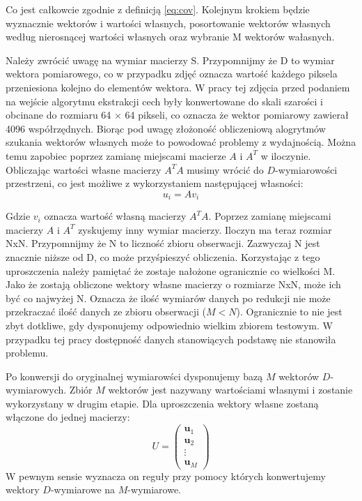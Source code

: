 \documentclass{article}
\newcommand{\bb}{\textbf}
\begin{document}
Co jest całkowcie zgodnie z definicją \ref{eq:cov}. Kolejnym krokiem będzie wyznacznie wektorów i wartości własnych, posortowanie wektorów własnych według nierosnącej wartości własnych oraz wybranie M wektorów wałasnych. 

Należy zwrócić uwagę na wymiar macierzy S. Przypomnijmy że D to wymiar wektora pomiarowego, co w przypadku zdjęć oznacza wartość każdego piksela przeniesiona kolejno do elementów wektora. W pracy tej zdjęcia przed podaniem na wejście algorytmu ekstrakcji cech były konwertowane do skali szarości i obcinane do rozmiaru 64 $\times$ 64 pikseli, co oznacza że wektor pomiarowy zawierał 4096 współrzędnych. Biorąc pod uwagę złożoność obliczeniową alogrytmów szukania wektorów własnych może to powodować problemy z wydajnością. Można temu zapobiec poprzez zamianę miejscami macierze $A$ i $A^T$ w iloczynie. Obliczając wartości własne macierzy $A^T A$ musimy wrócić do $D$-wymiarowości przestrzeni, co jest możliwe z wykorzystaniem następującej własności:
\begin{equation}
	u_i = A v_i
\end{equation}

Gdzie $v_i$ oznacza wartość własną macierzy $A^T A$. Poprzez zamianę miejscami macierzy $A$ i $A^T$ zyskujemy inny wymiar macierzy. Iloczyn ma teraz rozmiar NxN. Przypomnijmy że N to liczność zbioru obserwacji. Zazwyczaj N jest znacznie niższe od D, co może przyśpieszyć obliczenia. Korzystając z tego uproszczenia należy pamiętać że zostaje nałożone ogranicznie co wielkości M. Jako że zostają obliczone wektory własne macierzy o rozmiarze NxN, może ich być co najwyżej N. Oznacza że ilość wymiarów danych po redukcji nie może przekraczać ilość danych ze zbioru obserwacji ($M < N$). Ogranicznie to nie jest zbyt dotkliwe, gdy dysponujemy odpowiednio wielkim zbiorem testowym. W przypadku tej pracy dostępność danych stanowiących podstawę nie stanowiła problemu.

Po konwersji do oryginalnej wymiarowści dysponujemy bazą $M$ wektorów $D$-wymiarowych. Zbiór $M$ wektorów jest nazywany wartościami własnymi i zostanie wykorzystany w drugim etapie. Dla uproszczenia wektory własne zostaną włączone do jednej macierzy:
\begin{equation}
	U = 
	\left( \begin{array}{l}
		\bb{u}_1 \\
		\bb{u}_2 \\
		\vdots	 \\
		\bb{u}_M
	\end{array} \right)
\end{equation}
W pewnym sensie wyznacza on reguły przy pomocy których konwertujemy wektory $D$-wymiarowe na $M$-wymiarowe.
\end{document}
